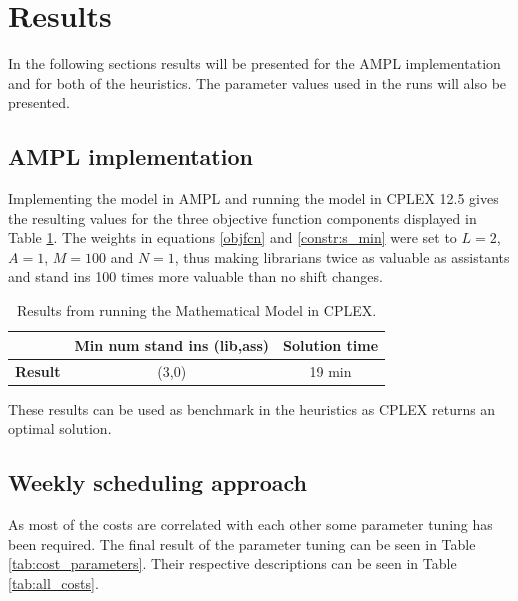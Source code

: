 \section{Results}
In the following sections results will be presented for the AMPL implementation and for both of the heuristics. The parameter values used in the runs will also be presented. 

\subsection{AMPL implementation}

Implementing the model in AMPL and running the model in CPLEX 12.5 gives the resulting values for the three objective function components displayed in Table \ref{tab:CPLEX_res}. The weights in equations \ref{objfcn} and \ref{constr:s_min} were set to $L = 2$, $A = 1$, $M =100$ and $N=1$, thus making librarians twice as valuable as assistants and stand ins 100 times more valuable than no shift changes. 

\begin{table}[!h]
\centering
\label{tab:CPLEX_res}
\caption{Results from running the Mathematical Model in CPLEX.}
\begin{tabular}{|l|l|l|}
\hline
\rowcolor{Gray} & \textbf{Min num stand ins (lib,ass)} & \textbf{Solution time} \\ \hline
\cellcolor{Gray} \textbf{Result} & \multicolumn{1}{c|}{(3,0)} & \multicolumn{1}{c|}{19 min} \\
\hline
\end{tabular}
\end{table}

These results can be used as benchmark in the heuristics as CPLEX returns an optimal solution. 

\subsection{Weekly scheduling approach}
As most of the costs are correlated with each other some parameter tuning has been required. The final result of the parameter tuning can be seen in Table \ref{tab:cost_parameters}. Their respective descriptions can be seen in Table \ref{tab:all_costs}. 


